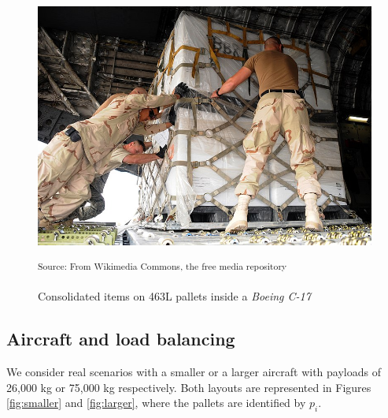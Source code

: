 \documentclass[preprint,authoryear]{elsarticle}
\begin{document}
\begin{figure}[H]
	\centering
	\includegraphics[scale=0.4]{Images/consolidated.jpg}
	\caption{Consolidated items on 463L pallets inside a {\it Boeing C-17}}
	\small\textsuperscript{Source: From Wikimedia Commons, the free media repository}
	\label{fig:larger2}
\end{figure}



\subsection{Aircraft and load balancing}


We consider real scenarios with a smaller or a larger aircraft with payloads of 26,000 kg or 75,000 kg respectively. Both layouts are represented in Figures \ref{fig:smaller} and \ref{fig:larger}, where the pallets are identified by $p_i$.
\end{document}
